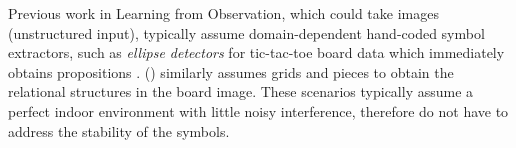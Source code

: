 Previous work in Learning from Observation, which could take images (unstructured input),
typically assume domain-dependent hand-coded symbol extractors,
such as \emph{ellipse detectors} for tic-tac-toe board data
which immediately obtains propositions \cite{BarbuNS10}.
\citeauthor{Kaiser12} (\citeyear{Kaiser12}) similarly assumes grids and pieces
to obtain the relational structures in the board image.
These scenarios typically assume a perfect indoor environment with little noisy interference,
therefore do not have to address the stability of the symbols.







%

